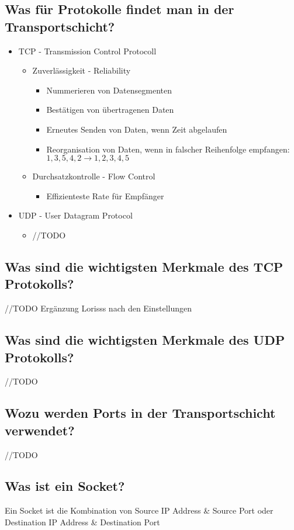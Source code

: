 \subsection*{Was für Protokolle findet man in der Transportschicht?}
\begin{itemize}
    \item TCP - Transmission Control Protocoll
    \begin{itemize}
        \item Zuverlässigkeit - Reliability
        \begin{itemize}
            \item Nummerieren von Datensegmenten
            \item Bestätigen von übertragenen Daten
            \item Erneutes Senden von Daten, wenn Zeit abgelaufen
            \item Reorganisation von Daten, wenn in falscher Reihenfolge empfangen: $1,3,5,4,2 \rightarrow 1,2,3,4,5$
        \end{itemize}
        \item Durchsatzkontrolle - Flow Control
        \begin{itemize}
            \item Effizienteste Rate für Empfänger
        \end{itemize}
    \end{itemize}
    \item UDP - User Datagram Protocol
    \begin{itemize}
        \item //TODO
    \end{itemize}
\end{itemize}
\subsection*{Was sind die wichtigsten Merkmale des TCP Protokolls?}
//TODO
Ergänzung Lorisss nach den Einstellungen
\subsection*{Was sind die wichtigsten Merkmale des UDP Protokolls?}
//TODO
\subsection*{Wozu werden Ports in der Transportschicht verwendet?}
//TODO
\subsection*{Was ist ein Socket?}
Ein Socket ist die Kombination von Source IP Address \& Source Port oder Destination IP Address \& Destination Port
